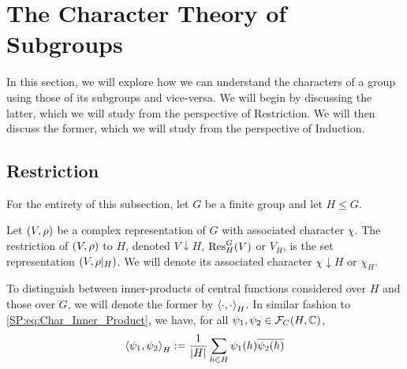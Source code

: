 \section{The Character Theory of Subgroups}

In this section, we will explore how we can understand the characters of a group using those of its subgroups and vice-versa. We will begin by discussing the latter, which we will study from the perspective of Restriction. We will then discuss the former, which we will study from the perspective of Induction.

\subsection{Restriction}

For the entirety of this subsection, let $G$ be a finite group and let $H \leq G$. %

\begin{boxdefinition}
    Let $\left( V, \rho \right)$ be a complex representation of $G$ with associated character $\chi$. The restriction of $\left( V, \rho \right)$ to $H$, denoted $V \downarrow H$, $\operatorname{Res}_H^G(V)$ or $V_H$, is the set representation $\left( V, \rho\vert_H \right)$. We will denote its associated character $\chi \downarrow H$ or $\chi_H$.
\end{boxdefinition}

\begin{boxnotation}
    To distinguish between inner-products of central functions considered over $H$ and those over $G$, we will denote the former by $\left\langle \cdot, \cdot \right\rangle_H$. In similar fashion to \eqref{SP:eq:Char_Inner_Product}, we have, for all $\psi_1, \psi_2 \in \mathcal{F}_C\!\left( H, \mathbb{C} \right)$,
    \begin{align}
        \left\langle \psi_1, \psi_2 \right\rangle_H := \frac{1}{\left\lvert H \right\rvert} \sum_{h \in H} \psi_1(h) \overline{\psi_2(h)}
    \end{align}
\end{boxnotation}

